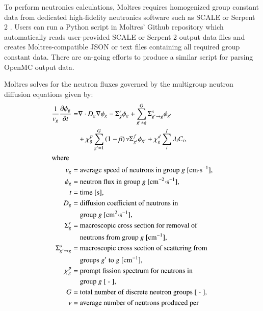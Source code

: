 To perform neutronics calculations, Moltres requires homogenized group constant
data from dedicated high-fidelity neutronics software such as SCALE
\citep{dehart_reactor_2011} or Serpent 2 \citep{leppanen_serpent_2014}. Users
can run a Python script in Moltres' Github repository which automatically reads
user-provided SCALE or Serpent 2 output data files and creates
Moltres-compatible JSON or text files containing all required group constant
data. There are on-going efforts to produce a similar script for parsing OpenMC
output data.

Moltres solves for the neutron fluxes governed by
the multigroup neutron diffusion equations given by:
%
\begin{align}
    \frac{1}{v_g} \frac{\partial \phi_g}{\partial t} =& \nabla \cdot D_g
    \nabla \phi_g - \Sigma^r_g \phi_g +
    \sum^G_{g' \neq g} \Sigma^s_{g' \rightarrow g} \phi_{g'} \nonumber \\
    &+ \chi^p_g \sum^G_{g'=1} \left( 1-\beta \right) \nu \Sigma^f_{g'}
    \phi_{g'} + \chi^d_g \sum^I_i \lambda_i C_i, \label{eq:neut} \\
    \intertext{where}
    v_g =& \text{ average speed of neutrons in group $g$ [cm$\cdot$s$^{-1}$],} 
    \nonumber \\
    \phi_g =& \text{ neutron flux in group $g$ [cm$^{-2}\cdot$s$^{-1}$],}
    \nonumber \\
    t =& \text{ time [s],} \nonumber \\
    D_g =& \text{ diffusion coefficient of neutrons in} \nonumber \\
    &\text{ group $g$ [cm$^2\cdot$s$^{-1}$],} \nonumber \\
    \Sigma^r_g =& \text{ macroscopic cross section for removal of} \nonumber \\
    &\text{ neutrons from group $g$ [cm$^{-1}$],} \nonumber \\
    \Sigma^s_{g' \rightarrow g} =& \text{ macroscopic cross section of
    scattering from} \nonumber \\
    &\text{ groups $g'$ to $g$ [cm$^{-1}$],} \nonumber \\
    \chi^p_g =& \text{ prompt fission spectrum for neutrons in} \nonumber \\
    &\text{ group $g$ [ - ],} \nonumber \\
    G =& \text{ total number of discrete neutron groups [ - ],} \nonumber \\
    \nu =& \text{ average number of neutrons produced per} \nonumber \\

\end{align}
